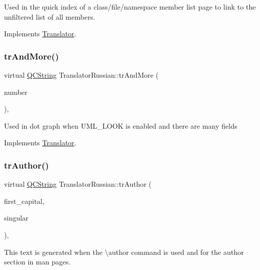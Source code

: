 Used in the quick index of a class/file/namespace member list page to link to the unfiltered list of all members. 

Implements \mbox{\hyperlink{class_translator}{Translator}}.

\mbox{\label{class_translator_russian_a0c1528995010d2aa0ba8e93fae63f5b3}} 
\subsubsection{\texorpdfstring{trAndMore()}{trAndMore()}}
{\footnotesize\ttfamily virtual \mbox{\hyperlink{class_q_c_string}{Q\+C\+String}} Translator\+Russian\+::tr\+And\+More (\begin{DoxyParamCaption}\item[{const \mbox{\hyperlink{class_q_c_string}{Q\+C\+String}} \&}]{number }\end{DoxyParamCaption})\hspace{0.3cm}{\ttfamily [inline]}, {\ttfamily [virtual]}}

Used in dot graph when U\+M\+L\+\_\+\+L\+O\+OK is enabled and there are many fields 

Implements \mbox{\hyperlink{class_translator}{Translator}}.

\mbox{\label{class_translator_russian_ad2d8de54e830da57b23eeda6154c6600}} 
\subsubsection{\texorpdfstring{trAuthor()}{trAuthor()}}
{\footnotesize\ttfamily virtual \mbox{\hyperlink{class_q_c_string}{Q\+C\+String}} Translator\+Russian\+::tr\+Author (\begin{DoxyParamCaption}\item[{bool}]{first\+\_\+capital,  }\item[{bool}]{singular }\end{DoxyParamCaption})\hspace{0.3cm}{\ttfamily [inline]}, {\ttfamily [virtual]}}

This text is generated when the \textbackslash{}author command is used and for the author section in man pages. 

